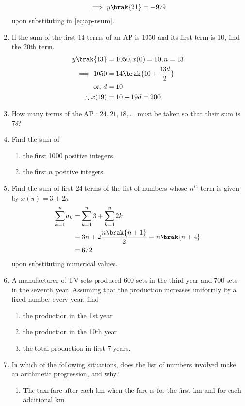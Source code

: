 \begin{enumerate}[label=\thesubsection.\arabic*, ref=\thesubsection.\theenumi]
\begin{align}
\implies 
	y\brak {21} = -979
\end{align}
upon substituting in 
	\eqref{eq:ap-nsum}.
\item If the sum of the first 14 terms of an AP is 1050 and its first term is 10,  find the 20th term.
	\\
	\solution
	\begin{align}
		y\brak {13} &= 1050, x(0) = 10, n = 13
		\\
		\implies 1050 &= 14\brak {10+\frac{13d}{2}}
		\\
		\text{or, } d&= 10
		\\
		\therefore
		x(19) &= 10+19d = 200
	\end{align}
\item How many terms of the AP : $24,  21,  18,  \dots$ must be taken so that their
sum is 78?
\item Find the sum of 
\begin{enumerate}
\item the first 1000 positive integers.
\item the first $n$ positive integers.
\end{enumerate}
\item Find the sum of first 24 terms of the list of numbers whose $n^{th}$ term is given by $x(n) = 3 + 2n$
	\\
	\solution
\begin{align}
	\sum_{k=1}^{n}a_k &= \sum_{k=1}^{n}3 + \sum_{k=1}^{n}2k
	\\
	&=3n + 2\frac{n\brak {n+1}}{2} = n\brak {n+4}
	\\
	&= 672
\end{align}
upon substituting numerical values.
\item A manufacturer of TV sets produced 600 sets in the third year and 700
sets in the seventh year. Assuming that the production increases uniformly by a fixed number every year,  find 
\begin{enumerate}
\item   the production in the 1st year
\item	the production in the 10th year
\item the total production in first 7 years.
\end{enumerate}
\item In which of the following situations,  does the list of numbers involved make an arithmetic progression,  and why?
\begin{enumerate}
\item The taxi fare after each km when the fare is  for the first km and  for each additional km.

\end{enumerate}
\end{enumerate}
